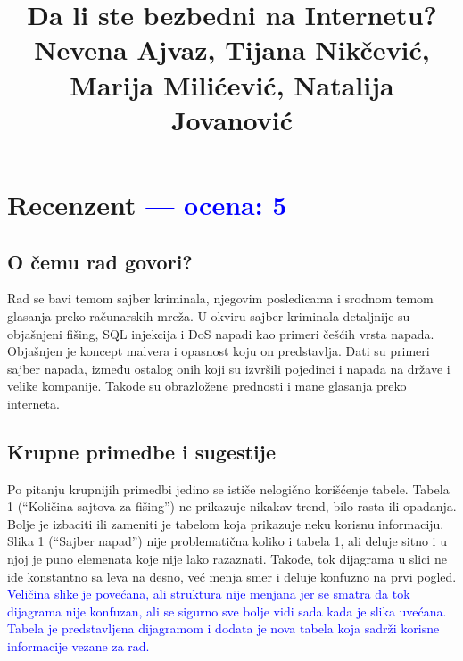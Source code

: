\documentclass[a4paper]{report}
\newcommand{\odgovor}[1]{\textcolor{blue}{#1}}
\begin{document}
\title{Da li ste bezbedni na Internetu?\\ \small{Nevena Ajvaz, Tijana Nikčević, Marija Milićević, Natalija Jovanović}}
\maketitle

\tableofcontents

\chapter{Recenzent \odgovor{--- ocena: 5} }


\section{O čemu rad govori?}

Rad se bavi temom sajber kriminala, njegovim posledicama i srodnom temom glasanja preko računarskih mreža. U okviru sajber kriminala detaljnije su objašnjeni fišing, SQL injekcija i DoS napadi kao primeri češćih vrsta napada. Objašnjen je koncept malvera i opasnost koju on predstavlja. Dati su primeri sajber napada, između ostalog onih koji su izvršili pojedinci i napada na države i velike kompanije. Takođe su obrazložene prednosti i mane glasanja preko interneta.

\section{Krupne primedbe i sugestije}

Po pitanju krupnijih primedbi jedino se ističe nelogično korišćenje tabele.
Tabela 1 (``Količina sajtova za fišing'') ne prikazuje nikakav trend, bilo rasta ili opadanja. Bolje je izbaciti ili zameniti je tabelom koja prikazuje neku korisnu informaciju. Slika 1 (``Sajber napad'') nije problematična koliko i tabela 1, ali deluje sitno i u njoj je puno elemenata koje nije lako razaznati. Takođe, tok dijagrama u slici ne ide konstantno sa leva na desno, već menja smer i deluje konfuzno na prvi pogled.\\
\odgovor {Veličina slike je povećana, ali struktura nije menjana jer se smatra da  tok dijagrama nije konfuzan, ali se sigurno sve bolje vidi sada kada je slika uvećana. Tabela je predstavljena dijagramom i dodata je nova tabela koja sadrži korisne informacije vezane za rad.}
\end{document}
